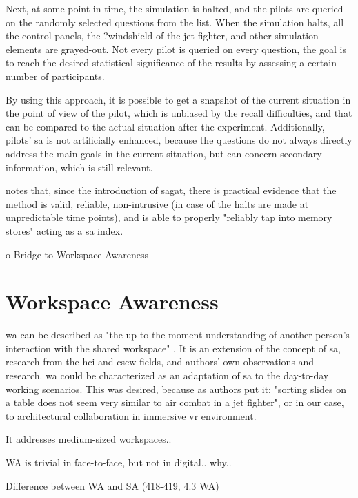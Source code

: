 Next, at some point in time, the simulation is halted, and the pilots are queried on the randomly selected questions from the list. When the simulation halts, all the control panels, the ?windshield of the jet-fighter, and other simulation elements are grayed-out. Not every pilot is queried on every question, the goal is to reach the desired statistical significance of the results by assessing a certain number of participants.

By using this approach, it is possible to get a snapshot of the current situation in the point of view of the pilot, which is unbiased by the recall difficulties, and that can be compared to the actual situation after the experiment. Additionally, pilots' \gls{sa} is not artificially enhanced, because the questions do not always directly address the main goals in the current situation, but can concern secondary information, which is still relevant.

\cite{endsley_direct_nodate} notes that, since the introduction of \gls{sagat}, there is practical evidence that the method is valid, reliable, non-intrusive (in case of the halts are made at unpredictable time points), and is able to properly "reliably tap into memory stores" acting as a \gls{sa} index. 


o Bridge to Workspace Awareness


\section{Workspace Awareness}
\gls{wa} can be described as "the up-to-the-moment understanding of another person’s interaction with the shared workspace" \cite{gutwin_descriptive_2002}. 
It is an extension of the concept of \gls{sa}, research from the \gls{hci} and \gls{cscw} fields, and authors' own observations and research. \gls{wa} could be characterized as an adaptation of \gls{sa} to the day-to-day working scenarios. This was desired, because as authors put it: "sorting slides on a table does not seem very similar to air combat in a jet fighter", or in our case, to architectural collaboration in immersive \gls{vr} environment.



It addresses medium-sized workspaces..

WA is trivial in face-to-face, but not in digital.. why..

Difference between WA and SA (418-419, 4.3 WA)

